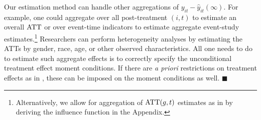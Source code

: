 \documentclass[12pt]{article}
\begin{document}
\begin{remark}

Our estimation method can handle other aggregations of $y_{it} - \hat{y}_{it}(\infty)$. For example, one could aggregate over all post-treatment $(i,t)$ to estimate an overall $\text{ATT}$ or over event-time indicators to estimate aggregate event-study estimates.\footnote{Alternatively, we allow for aggregation of $\text{ATT}(g,t)$ estimates as in \citet{Callaway_Santanna_2021} by deriving the influence function in the Appendix.
} Researchers can perform heterogeneity analyses by estimating the ATTs by gender, race, age, or other observed characteristics. All one needs to do to estimate such aggregate effects is to correctly specify the unconditional treatment effect moment conditions. If there are \emph{a priori} restrictions on treatment effects as in \citet{Borusyak_Jaravel_Spiess_2021}, these can be imposed on the moment conditions as well. $\blacksquare$
\end{remark}
\end{document}

